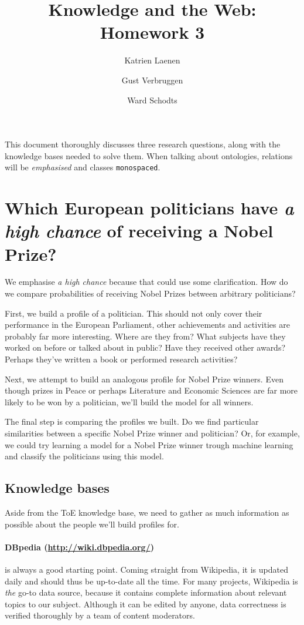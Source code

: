 \documentclass[12pt,a4paper]{article}
\author{
  Katrien Laenen\\
  \and
  Gust Verbruggen\\
  \and
  Ward Schodts
}
\title{Knowledge and the Web: Homework 3}
\begin{document}
\maketitle

This document thoroughly discusses three research questions, along with the knowledge bases needed to solve them. When talking about ontologies, relations will be \emph{emphasised} and classes \texttt{monospaced}.

\section{Which European politicians have \emph{a high chance} of receiving a Nobel Prize?}

We emphasise \emph{a high chance} because that could use some clarification. How do we compare probabilities of receiving Nobel Prizes between arbitrary politicians?
\par First, we build a profile of a politician. This should not only cover their performance in the European Parliament, other achievements and activities are probably far more interesting. Where are they from? What subjects have they worked on before or talked about in public? Have they received other awards? Perhaps they've written a book or performed research activities?
\par Next, we attempt to build an analogous profile for Nobel Prize winners. Even though prizes in Peace or perhaps Literature and Economic Sciences are far more likely to be won by a politician, we'll build the model for all winners.
\par The final step is comparing the profiles we built. Do we find particular similarities between a specific Nobel Prize winner and politician? Or, for example, we could try learning a model for a Nobel Prize winner trough machine learning and classify the politicians using this model.

\subsection*{Knowledge bases}

Aside from the ToE knowledge base, we need to gather as much information as possible about the people we'll build profiles for.

\paragraph{\textbf{DBpedia} (\url{http://wiki.dbpedia.org/})}
is always a good starting point. Coming straight from Wikipedia, it is updated daily and should thus be up-to-date all the time. For many projects, Wikipedia is \emph{the} go-to data source, because it contains complete information about relevant topics to our subject. Although it can be edited by anyone, data correctness is verified thoroughly by a team of content moderators.
\end{document}
